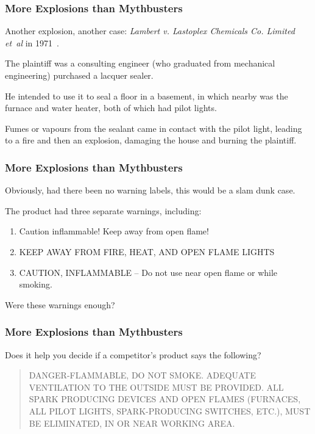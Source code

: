 \begin{frame}
\frametitle{More Explosions than Mythbusters}

Another explosion, another case: \textit{Lambert v. Lastoplex Chemicals Co. Limited et~al} in 1971~\cite{lpe}.

The plaintiff was a consulting engineer (who graduated from mechanical engineering) purchased a lacquer sealer.

He intended to use it to seal a floor in a basement, in which nearby was the furnace and water heater, both of which had pilot lights.

Fumes or vapours from the sealant came in contact with the pilot light, leading to a fire and then an explosion, damaging the house and burning the plaintiff.

\end{frame}



\begin{frame}
\frametitle{More Explosions than Mythbusters}

Obviously, had there been no warning labels, this would be a slam dunk case.

The product had three separate warnings, including:

\begin{enumerate}
	\item Caution inflammable! Keep away from open flame!
	\item KEEP AWAY FROM FIRE, HEAT, AND OPEN FLAME LIGHTS
	\item CAUTION, INFLAMMABLE -- Do not use near open flame or while smoking.
\end{enumerate}

Were these warnings enough?

\end{frame}



\begin{frame}
\frametitle{More Explosions than Mythbusters}

Does it help you decide if a competitor's product says the following?

\begin{quote}
DANGER-FLAMMABLE, DO NOT SMOKE. ADEQUATE VENTILATION TO THE OUTSIDE MUST BE PROVIDED. ALL SPARK PRODUCING DEVICES AND OPEN FLAMES (FURNACES, ALL PILOT LIGHTS, SPARK-PRODUCING SWITCHES, ETC.), MUST BE ELIMINATED, IN OR NEAR WORKING AREA.
\end{quote}


\end{frame}

